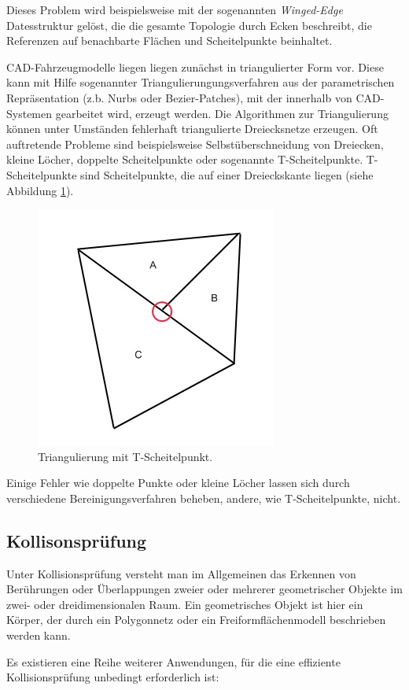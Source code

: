 Dieses Problem wird beispielsweise mit der sogenannten \textit{Winged-Edge} Datesstruktur gel\"ost, die die gesamte Topologie durch Ecken beschreibt, die Referenzen auf benachbarte Fl\"achen und Scheitelpunkte beinhaltet. 

CAD-Fahrzeugmodelle liegen liegen zunächst in triangulierter Form vor. Diese kann mit Hilfe sogenannter Triangulierungungsverfahren aus der parametrischen Repr\"asentation (z.b. Nurbs oder Bezier-Patches), mit der innerhalb von CAD-Systemen gearbeitet wird, erzeugt werden. Die Algorithmen zur Triangulierung k\"onnen unter Umst\"anden fehlerhaft triangulierte Dreiecksnetze erzeugen. Oft auftretende Probleme sind beispielsweise Selbst\"uberschneidung von Dreiecken, kleine L\"ocher, doppelte Scheitelpunkte oder sogenannte T-Scheitelpunkte. T-Scheitelpunkte sind Scheitelpunkte, die auf einer Dreieckskante liegen (siehe Abbildung \ref{tvertice}). 

\begin{figure}[H]
\centerline{
	\includegraphics[width=0.4\columnwidth]{graphics/tvertices.jpg}
}
\caption{Triangulierung mit T-Scheitelpunkt.}
\label{tvertice}
\end{figure}

Einige Fehler wie doppelte Punkte oder kleine L\"ocher lassen sich durch verschiedene Bereinigungsverfahren beheben, andere, wie T-Scheitelpunkte, nicht.

\subsection{Kollisonspr\"ufung}
\label{colGeo}
 
 Unter Kollisionspr\"ufung versteht man im Allgemeinen das Erkennen von Ber\"uhrungen
oder \"Uberlappungen zweier oder mehrerer geometrischer Objekte im zwei- oder dreidimensionalen Raum.
Ein geometrisches Objekt ist hier ein K\"orper, der durch ein Polygonnetz oder
ein Freiformfl\"achenmodell beschrieben werden kann.

Es existieren eine Reihe weiterer Anwendungen, f\"ur die eine effiziente Kollisions\-pr\"ufung
unbedingt erforderlich ist:

